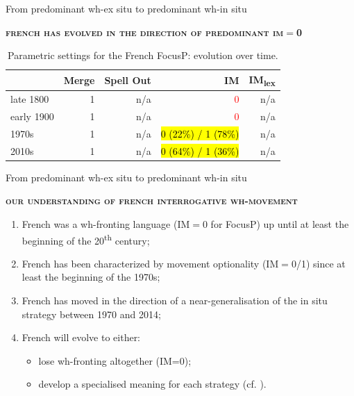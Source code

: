 \documentclass[lesson_slides]{subfiles}
\begin{document}
\begin{frame}[c]{From predominant wh-ex situ to predominant wh-in situ}

        \textbf{\textsc{french has evolved in the direction of predominant im$=$0}}

        \begin{table}[H]
        \centering
        \begin{tabular}{|l|r|r|r|r|}
        \hline
         & Merge & Spell Out & IM & IM\textsubscript{lex} \\
        \hline
        late 1800 & 1 & n/a & \textcolor{red}{0} & n/a \\
        \hline
        early 1900 & 1 & n/a & \textcolor{red}{0} & n/a \\
        \hline
        1970s & 1 & n/a & \hl{0 (22\%) / 1 (78\%)} & n/a \\
        \hline
        2010s & 1 & n/a & \hl{0 (64\%) / 1 (36\%)} & n/a \\
        \hline
        \end{tabular}
        \caption{\label{tab:samp}Parametric settings for the French FocusP: evolution over time.}
    \end{table}
  
\end{frame}
\begin{frame}[c]{From predominant wh-ex situ to predominant wh-in situ}


    \noindent \textbf{\textsc{our understanding of french interrogative wh-movement}} \pause
    \begin{enumerate}
        \item French was a wh-fronting language (IM$=$0 for FocusP) up until at least the beginning of the 20\textsuperscript{th} century;\pause
        \item French has been characterized by movement optionality (IM$=$0/1) since at least the beginning of the 1970s; \pause
        \item French has moved in the direction of a near-generalisation of the in situ strategy between 1970 and 2014; \pause 
        \item French will evolve to either: \pause
        \begin{itemize}
            \item lose wh-fronting altogether (IM=0); \pause
            \item develop a specialised meaning for each strategy (cf. \cite{faure2021exclusivity}).
        \end{itemize}    
    \end{enumerate}
  
\end{frame}
\end{document}
